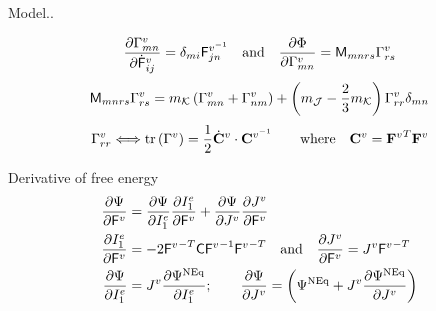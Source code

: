 \documentclass{beamer}
\def\myPhi{{\mathrm{\Phi}}}
\def\myPsi{{\mathrm{\Psi}}}
\def\myF{{\mathsf{F}}}
\def\myC{{\bf\mathsf{C}}}
\def\myM{{\mathsf{M}}}
\begin{document}
\begin{frame}{Model..}
    \begin{block}{}
        \footnotesize\begin{equation*}
            \del{\Gamma^v_{mn}}{\dot{\myF}^v_{ij}} = \delta_{mi}\myF^{v^{-1}}_{jn}\quad\text{and}\quad\del{\myPhi}{\Gamma^v_{mn}} = \myM_{mnrs}\Gamma^v_{rs}
        \end{equation*}
        \begin{equation*}
            \myM_{mnrs}\Gamma^v_{rs} =  m_{\mathcal{K}}\lr{
                \Gamma^v_{mn} + \Gamma^v_{nm}
            } + \left(m_\mathcal{J} - \frac{2}{3}m_\mathcal{K}\right)\Gamma^v_{rr}\delta_{mn}
        \end{equation*}
        \begin{align*}
            \Gamma^v_{rr} \Longleftrightarrow \text{tr}\left(
                \Gamma^v
            \right) = \frac{1}{2}\dot{\bf C}^v\cdot{\bf C}^{v^{-1}}\qquad \text{where}\quad {\bf C}^v = {{\bf F}^v}^T {\bf F}^v
        \end{align*}
    \end{block}
    \begin{block}{Derivative of free energy}
        \footnotesize\begin{align*}
            \del{\myPsi}{\myF^v}
            & =
            \del{\myPsi}{I^e_1}\del{I^e_1}{\myF^v} + 
            \del{\myPsi}{J^v}\del{J^v}{\myF^v} \\
            \del{I^e_1}{\myF^v} & = -2 {\myF^v}^{-T}\myC{\myF^v}^{-1}{\myF^v}^{-T}\quad\text{and}\quad
            \del{J^v}{\myF^v} = J^v{\myF^v}^{-T} \\
            \del{\myPsi}{I^e_1} & = J^v\del{\myPsi^{\rm NEq}}{I^e_1};\qquad
            \del{\myPsi}{J^v} = \left( \myPsi^{\rm NEq} + J^v\del{\myPsi^{\rm NEq}}{J^v}\right)
        \end{align*}
    \end{block}
    \end{frame}
\end{document}
